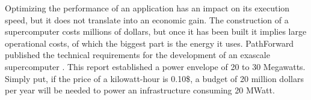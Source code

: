     
    Optimizing the performance of an application has an impact on its execution speed, but it  does not translate into an economic gain. The construction of a supercomputer costs millions of dollars, but once it has been built it implies large operational costs, of which the biggest part is the energy it uses. PathForward published the technical requirements for the development of an exascale supercomputer \cite{Ang2016}. This report established a power envelope of 20 to 30 Megawatts. Simply put, if the price of a kilowatt-hour is 0.10\$, a budget of 20 million dollars per year will be needed to power an infrastructure consuming 20 MWatt.

\fi